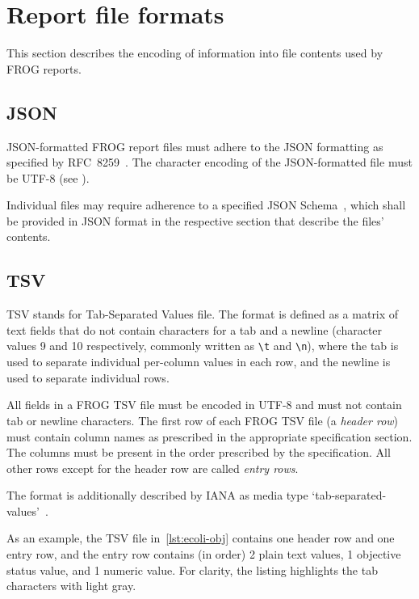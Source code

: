 \section{Report file formats}

This section describes the encoding of information into file contents used by FROG reports.

\subsection{JSON}
\label{sec:json}

JSON-formatted FROG report files must adhere to the JSON formatting as specified by RFC~8259~\cite{rfc8259}.
The character encoding of the JSON-formatted file must be UTF-8 (see \cite[][section 8.1]{rfc8259}).

Individual files may require adherence to a specified JSON Schema~\cite{pezoa2016jsonschema}, which shall be provided in JSON format in the respective section that describe the files' contents.

\subsection{TSV}
\label{sec:tsv}

TSV stands for Tab-Separated Values file. The format is defined as a matrix of text fields that do not contain characters for a tab and a newline (character values 9 and 10 respectively, commonly written as \verb|\t| and \verb|\n|), where the tab is used to separate individual per-column values in each row, and the newline is used to separate individual rows.

All fields in a FROG TSV file must be encoded in UTF-8 and must not contain tab or newline characters. The first row of each FROG TSV file (a \emph{header row}) must contain column names as prescribed in the appropriate specification section. The columns must be present in the order prescribed by the specification. All other rows except for the header row are called \emph{entry rows}.

The format is additionally described by IANA as media type `tab-separated-values'~\cite{ianatsv}.

As an example, the TSV file in~\cref{lst:ecoli-obj} contains one header row and one entry row, and the entry row contains (in order) 2 plain text values, 1 objective status value, and 1 numeric value. For clarity, the listing highlights the tab characters with light gray.

